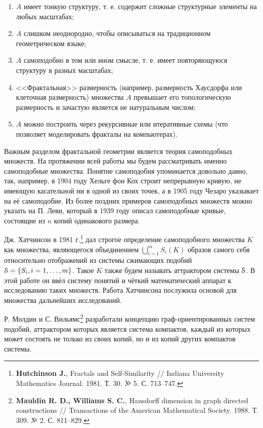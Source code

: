 \documentclass[a5paper,9pt,twoside]{extarticle} %
\begin{document}
\begin{enumerate}
\item $A$ имеет тонкую структуру, т. е. содержит сложные структурные элементы на любых масштабах;
\item $A$ слишком неоднородно, чтобы описываться на традиционном геометрическом языке;
\item $A$ самоподобно в том или ином смысле, т. е. имеет повторяющуюся структуру в разных масштабах;
\item <<Фрактальная>> размерность (например, размерность Хаусдорфа или клеточная размерность) множества $A$ превышает его топологическую размерность и зачастую является не натуральным числом;
\item $A$ можно построить через рекурсивные или итеративные схемы (что позволяет моделировать фракталы на компьютерах).
\end{enumerate}


Важным разделом фрактальной геометрии является теория самоподобных множеств.
На протяжении всей работы мы будем рассматривать именно самоподобные множества.
Понятие самоподобия упоминается довольно давно, так, например, в 1904 году Хельге фон Кох строит непрерывную кривую, не имеющую касательной ни в одной из своих точек, а в 1905 году Чезаро указывает на её самоподобие.
Из более поздних примеров самоподобных множеств можно указать на П. Леви, который в 1939 году описал самоподобные кривые, состоящие из $n$ копий одинакового размера.

Дж. Хатчинсон в 1981 г.\footnote{{\bf Hutchinson J.}, Fractals and Self-Similarity // Indiana University Mathematics Journal. 1981. Т. 30. № 5. С. 713--747.} дал строгое определение самоподобного множества $K$ как множества, являющегося объединением $\bigcup_{i=1}^mS_i(K)$ образов самого себя относительно отображений из системы сжимающих подобий ${\EuScript S}=\{S_i, i=1,\ldots,m\}$.
Такое $K$ также будем называть аттрактором системы ${\EuScript S}$.
В этой работе он ввёл систему понятий и чёткий математический аппарат к исследованию таких множеств.
Работа Хатчинсона послужила основой для множества дальнейших исследований.

Р. Молдин и С. Вильямс\footnote{{\bf Mauldin R. D., Williams S. C.}, Hausdorff dimension in graph directed constructions // Transactions of the American Mathematical Society. 1988. Т. 309. № 2. С. 811--829.} разработали концепцию граф-ори\-ен\-ти\-ро\-ванных систем подобий, аттрактором которых является система компактов, каждый из которых может состоять не только из своих копий, но и из копий других компактов системы.
\end{document}
